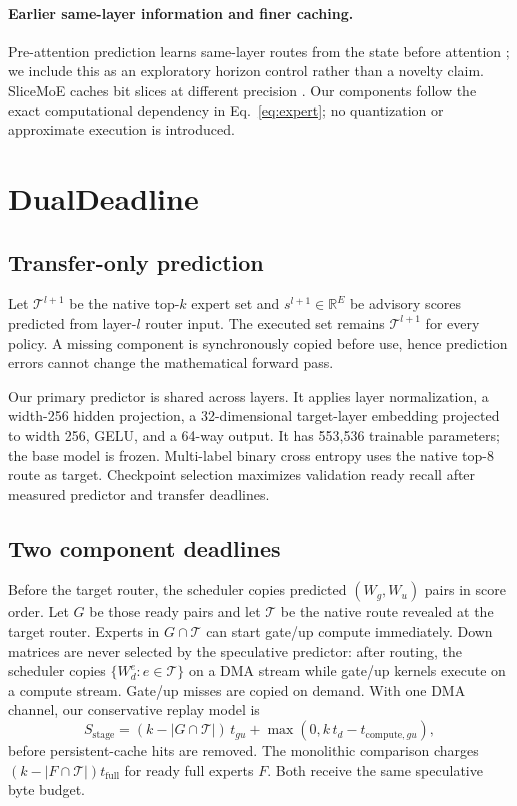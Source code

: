 \documentclass[10pt,twocolumn]{article}
\newcommand{\method}{DualDeadline}
\begin{document}
\paragraph{Earlier same-layer information and finer caching.}
Pre-attention prediction learns same-layer routes from the state before
attention \cite{zhu2025preattention}; we include this as an exploratory horizon
control rather than a novelty claim.  SliceMoE caches bit slices at different
precision \cite{choi2025slicemoe}.  Our components follow the exact
computational dependency in Eq.~\ref{eq:expert}; no quantization or approximate
execution is introduced.

\section{\method{}}
\subsection{Transfer-only prediction}
Let $\mathcal{T}^{l+1}$ be the native top-$k$ expert set and
$s^{l+1}\in\mathbb{R}^{E}$ be advisory scores predicted from layer-$l$ router
input.  The executed set remains $\mathcal{T}^{l+1}$ for every policy.  A
missing component is synchronously copied before use, hence prediction errors
cannot change the mathematical forward pass.

Our primary predictor is shared across layers.  It applies layer normalization,
a width-256 hidden projection, a 32-dimensional target-layer embedding
projected to width 256, GELU, and a 64-way output.  It has 553,536 trainable
parameters; the base model is frozen.  Multi-label binary cross entropy uses
the native top-8 route as target.  Checkpoint selection maximizes validation
ready recall after measured predictor and transfer deadlines.

\subsection{Two component deadlines}
Before the target router, the scheduler copies predicted $(W_g,W_u)$ pairs in
score order.  Let $G$ be those ready pairs and let $\mathcal{T}$ be the native
route revealed at the target router.  Experts in $G\cap\mathcal{T}$ can start
gate/up compute immediately.  Down matrices are never selected by the
speculative predictor: after routing, the scheduler copies
$\{W_d^e:e\in\mathcal{T}\}$ on a DMA stream while gate/up kernels execute on a
compute stream.  Gate/up misses are copied on demand.  With one DMA channel,
our conservative replay model is
\begin{equation}
S_{\mathrm{stage}} =
(k-|G\cap\mathcal{T}|)\,t_{gu}
+ \max(0, k\,t_d-t_{\mathrm{compute},gu}),
\label{eq:stall}
\end{equation}
before persistent-cache hits are removed.  The monolithic comparison charges
$(k-|F\cap\mathcal{T}|)t_{\mathrm{full}}$ for ready full experts $F$.  Both
receive the same speculative byte budget.
\end{document}
